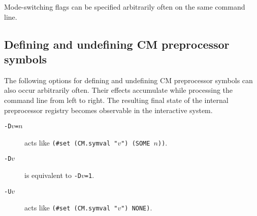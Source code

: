 Mode-switching flags can be specified arbitrarily often on the same
command line.

\subsection{Defining and undefining CM preprocessor symbols}
\label{sec:cmdline:defundef}

The following options for defining and undefining CM preprocessor
symbols can also occur arbitrarily often.  Their effects accumulate
while processing the command line from left to right.  The resulting
final state of the internal preprocessor registry becomes observable
in the interactive system.

\begin{description}
\item[{\tt -D$v$=$n$}] acts like {\tt (\#set (CM.symval "$v$") (SOME $n$))}.
\item[{\tt -D$v$}] is equivalent to {\tt -D$v$=1}.
\item[{\tt -U$v$}] acts like {\tt (\#set (CM.symval "$v$") NONE)}.
\end{description}
